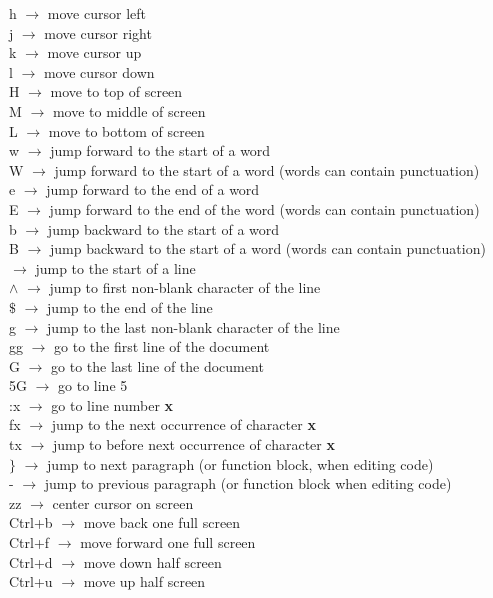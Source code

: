 \documentclass[twoside,a4paper]{article}
\newcommand{\tck}{\color{black}}
\newcommand{\ra }{$\rightarrow$ }
\begin{document}
\begin{multicols}{2}
    \tcr h \tck \ra move cursor left\\
    \tcr j \tck \ra move cursor right\\
    \tcr k \tck \ra move cursor up\\
    \tcr l \tck \ra move cursor down\\
    \tcr H \tck \ra move to top of screen\\
    \tcr M \tck \ra move to middle of screen\\
    \tcr L \tck \ra move to bottom of screen\\
    \tcr w \tck \ra jump forward to the start of a word\\
    \tcr W \tck \ra jump forward to the start of a word (words can contain punctuation)\\
    \tcr e \tck \ra jump forward to the end of a word\\
    \tcr E \tck \ra jump forward to the end of the word (words can contain punctuation)\\
    \tcr b \tck \ra jump backward to the start of a word\\
    \tcr B \tck \ra jump backward to the start of a word (words can contain punctuation)\\
     \tck \ra jump to the start of a line\\
    \tcr $\wedge$ \tck \ra jump to first non-blank character of the line\\
    \tcr $\$$ \tck \ra jump to the end of the line\\
    \tcr g \tck \ra jump to the last non-blank character of the line\\
    \tcr gg \tck \ra go to the first line of the document\\
    \tcr G \tck \ra go to the last line of the document\\
    \tcr 5G \tck \ra go to line 5\\
    \tcr :x \tck \ra go to line number \textbf{x}\\
    \tcr fx \tck \ra jump to the next occurrence of character \textbf{x}\\
    \tcr tx \tck \ra jump to before next occurrence of character \textbf{x}\\
    \tcr $\}$ \tck \ra jump to next paragraph (or function block, when editing code)\\
    \tcr - \tck \ra jump to previous paragraph (or function block when editing code)\\
    \tcr zz \tck \ra center cursor on screen\\
    \tcr Ctrl+b \tck \ra move back one full screen\\
    \tcr Ctrl+f \tck \ra move forward one full screen\\
    \tcr Ctrl+d \tck \ra move down half screen\\
    \tcr Ctrl+u \tck \ra move up half screen


\end{multicols}
\end{document}
